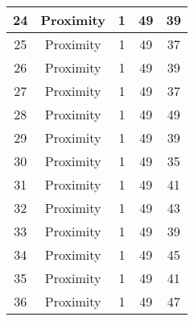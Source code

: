 \documentclass[results.tex]{subfiles}
\begin{document}
\begin{center}
\begin{tabular}{| c || c | c | c | c |}
            \hline
            24                      & Proximity                    & 1                      & 49                      & 39                   \\
            \hline
            25                      & Proximity                    & 1                      & 49                      & 37                   \\
            \hline
            26                      & Proximity                    & 1                      & 49                      & 39                   \\
            \hline
            27                      & Proximity                    & 1                      & 49                      & 37                   \\
            \hline
            28                      & Proximity                    & 1                      & 49                      & 49                   \\
            \hline
            29                      & Proximity                    & 1                      & 49                      & 39                   \\
            \hline
            30                      & Proximity                    & 1                      & 49                      & 35                   \\
            \hline
            31                      & Proximity                    & 1                      & 49                      & 41                   \\
            \hline
            32                      & Proximity                    & 1                      & 49                      & 43                   \\
            \hline
            33                      & Proximity                    & 1                      & 49                      & 39                   \\
            \hline
            34                      & Proximity                    & 1                      & 49                      & 45                   \\
            \hline
            35                      & Proximity                    & 1                      & 49                      & 41                   \\
            \hline
            36                      & Proximity                    & 1                      & 49                      & 47                   \\

\end{tabular}
\end{center}
\end{document}
